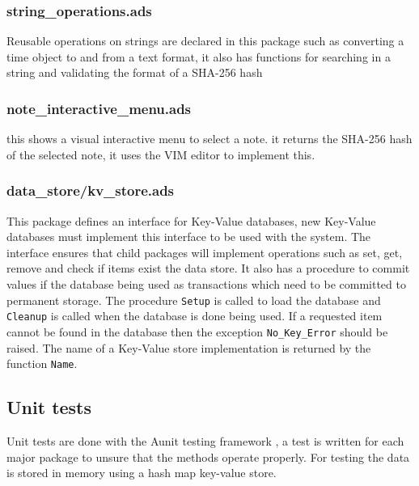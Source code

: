 \documentclass[12pt,a4paper]{article}
\newcommand{\codetext}[1]{\colorbox{light-gray}{\texttt{#1}}}
\begin{document}
\subsubsection{string\_operations.ads}
Reusable operations on strings are declared in this package such as converting a time object to and from a text format, it also has functions for searching in a string and validating the format of a SHA-256 hash

\subsubsection{note\_interactive\_menu.ads}
this shows a visual interactive menu to select a note. it returns the SHA-256 hash of the selected note, it uses the VIM editor to implement this.

\subsubsection{data\_store/kv\_store.ads}
This package defines an interface for Key-Value databases, new Key-Value databases must implement this interface to be used with the system. The interface ensures that child packages will implement operations such as set, get, remove and check if items exist the data store. It also has a procedure to commit values if the database being used as transactions which need to be committed to permanent storage. The procedure \codetext{Setup} is called to load the database and \codetext{Cleanup} is called when the database is done being used. If a requested item cannot be found in the database then the exception \codetext{No\_Key\_Error} should be raised. The name of a Key-Value store implementation is returned by the function \codetext{Name}.

\subsection{Unit tests}
Unit tests are done with the Aunit testing framework \cite{Aunit},  a test is written for each major package to unsure that the methods operate properly. For testing the data is stored in memory using a hash map key-value store.
\end{document}
